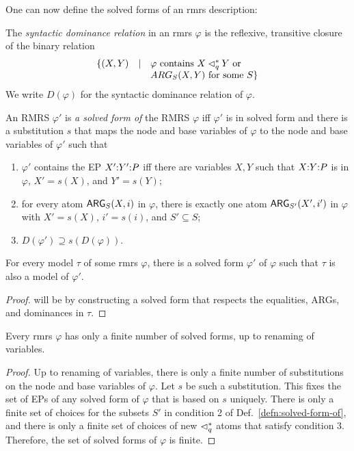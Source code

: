 One can now define the solved forms of an {\sc rmrs}
description:
\begin{definition}  \label{defn:solved-form-of}
  The \emph{syntactic dominance relation} in an {\sc  rmrs} $\varphi$ is the
  reflexive, transitive closure of the binary relation $$
\begin{array}{r c l}
\{(X,Y) & \mid &  \mbox{$\varphi$ contains $X \lhd^*_q Y$ or}\\
&& \mbox{$ARG_S(X,Y)$ for some
    $S$}\}
\end{array}
$$  
We write $D(\varphi)$ for the syntactic dominance
  relation of $\varphi$.

  An RMRS $\varphi'$ is \emph{a solved form of} the RMRS $\varphi$
  iff $\varphi'$ is in solved form and there is a substitution $s$
  that maps the  node and base variables of $\varphi$ to the node and
  base variables of $\varphi'$ such that
  \begin{enumerate}
  \item $\varphi'$ contains the EP $X' {:} Y' {:} P$ iff there are
    variables $X,Y$ such that $X {:} Y {:} P$ is in $\varphi$, $X' =
    s(X)$, and $Y' = s(Y)$;
  \item for every atom $\mathsf{ARG}_S(X,i)$ in $\varphi$, there is exactly
    one atom $\mathsf{ARG}_{S'}(X',i')$ in $\varphi$ with $X' = s(X)$, $i' =
    s(i)$, and $S' \subseteq S$;
  \item $D(\varphi') \supseteq s(D(\varphi))$.
  \end{enumerate}
\end{definition}

\begin{claim}
  For every model $\tau$ of some {\sc rmrs} $\varphi$, there is a solved form
  $\varphi'$ of $\varphi$ such that $\tau$ is also a model of $\varphi'$.
\end{claim}
\begin{proof}
  will be by constructing a solved form that respects the equalities,
  ARGs, and dominances in $\tau$.
\end{proof}

\begin{prop}
  Every {\sc rmrs} $\varphi$ has only a finite number of solved forms, up to
  renaming of variables.
\end{prop}
\begin{proof}
  Up to renaming of variables, there is only a finite number of
  substitutions on the node and base variables of $\varphi$.  Let $s$
  be such a substitution.  This fixes the set of EPs of any solved
  form of $\varphi$ that is based on $s$ uniquely.  There is only a
  finite set of choices for the subsets $S'$ in condition 2 of
  Def.~\ref{defn:solved-form-of}, and there is only a finite set of
  choices of new $\lhd^*_q$ atoms that satisfy condition 3.  Therefore,
  the set of solved forms of $\varphi$ is finite.
\end{proof}




